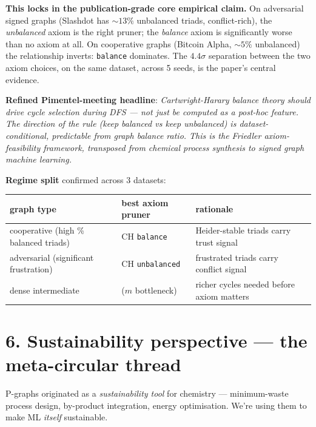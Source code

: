 \documentclass[11pt,a4paper]{article}
\newcommand{\code}[1]{\texttt{\small #1}}
\begin{document}
\textbf{This locks in the publication-grade core empirical claim.} On
adversarial signed graphs (Slashdot has $\sim 13\%$ unbalanced triads,
conflict-rich), the \emph{unbalanced} axiom is the right pruner; the
\emph{balance} axiom is significantly worse than no axiom at all. On
cooperative graphs (Bitcoin Alpha, $\sim 5\%$ unbalanced) the
relationship inverts: \code{balance} dominates. The $4.4\sigma$
separation between the two axiom choices, on the same dataset,
across 5 seeds, is the paper's central evidence.

\textbf{Refined Pimentel-meeting headline}:
\emph{Cartwright-Harary balance theory should drive cycle selection
during DFS --- not just be computed as a post-hoc feature. The
direction of the rule (keep balanced vs keep unbalanced) is
dataset-conditional, predictable from graph balance ratio. This is
the Friedler axiom-feasibility framework, transposed from chemical
process synthesis to signed graph machine learning.}

\textbf{Regime split} confirmed across 3 datasets:

\begin{center}
\begin{tabular}{l l l}
\toprule
graph type                              & best axiom pruner & rationale \\
\midrule
cooperative (high \% balanced triads)   & CH \code{balance}     & Heider-stable triads carry trust signal \\
adversarial (significant frustration)   & CH \code{unbalanced}  & frustrated triads carry conflict signal \\
dense intermediate                      & ($m$ bottleneck)      & richer cycles needed before axiom matters \\
\bottomrule
\end{tabular}
\end{center}

\section*{6. Sustainability perspective --- the meta-circular thread}

\begin{tcolorbox}[colback=warn!12,colframe=warn,boxrule=0.3mm,arc=2pt]
P-graphs originated as a \emph{sustainability tool} for chemistry
--- minimum-waste process design, by-product integration, energy
optimisation. We're using them to make ML \emph{itself} sustainable.
\end{tcolorbox}
\end{document}
